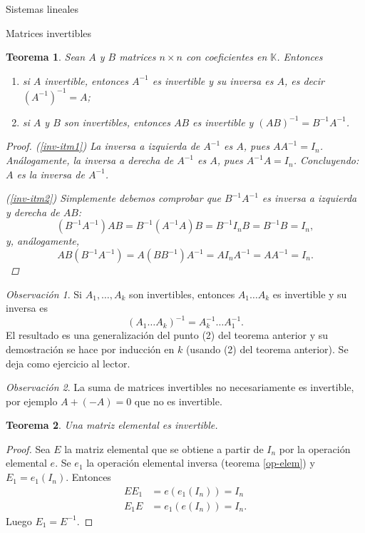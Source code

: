 \documentclass[a4paper,12pt,twoside,spanish]{amsbook}
\newtheorem{teorema}{Teorema}[section]
\theoremstyle{definition}
\theoremstyle{remark}
\newtheorem{observacion}{Observaci\'on}[section]
\newcommand{\K}{\mathbb K}
\begin{document}
\begin{chapter}{Sistemas lineales}
\begin{section}{Matrices invertibles}
			
			
			\begin{teorema}\label{th-prod-inv-impl-inv}
				Sean $A$ y $B$ matrices $n \times n$ con coeficientes en $\K$. Entonces
				\begin{enumerate}
					\item \label{inv-itm1} si $A$ invertible,  entonces $A^{-1}$  es invertible y su inversa es $A$,  es decir $(A^{-1})^{-1}=A$;
					\item \label{inv-itm2} si $A$ y $B$ son invertibles, entonces $AB$ es invertible y $(AB)^{-1} = B^{-1}A^{-1}$.
				\end{enumerate}
				\begin{proof}
					(\ref{inv-itm1}) La inversa a izquierda de $A^{-1}$ es $A$, pues $AA^{-1}=I_n$. Análogamente, la inversa a derecha de $A^{-1}$ es $A$, pues $A^{-1}A = I_n$. Concluyendo: $A$  es la inversa de $A^{-1}$.
					
					(\ref{inv-itm2}) Simplemente debemos comprobar que $B^{-1}A^{-1}$ es inversa a izquierda y derecha de $AB$:
					\begin{equation*}
					(B^{-1}A^{-1})AB = B^{-1}(A^{-1}A)B = B^{-1}I_nB =B^{-1}B = I_n,
					\end{equation*}
					y,  análogamente,
					\begin{equation*}
					AB(B^{-1}A^{-1}) = A(BB^{-1})A^{-1} = AI_nA^{-1} =AA^{-1} = I_n.
					\end{equation*} 
				\end{proof}
			\end{teorema}
			
			\begin{observacion}
				Si $A_1,\ldots,A_k$  son invertibles,  entonces $A_1\ldots A_k$ es invertible y su inversa es  $$(A_1\ldots A_k)^{-1} = A_k^{-1}\ldots A_1^{-1} .$$
				El resultado es una generalización del punto (2) del teorema anterior y su demostración se hace por inducción en $k$ (usando (2)  del teorema anterior). Se deja como ejercicio al lector. 
			\end{observacion}
			
			\begin{observacion}
				La suma de matrices invertibles no necesariamente es invertible, por ejemplo $A+ (-A)= 0$ que no es invertible. 
			\end{observacion}	
			
			
			\begin{teorema}\label{th-elmental-impl-invertible}
				Una matriz elemental es invertible.
			\end{teorema}
			\begin{proof}
				Sea $E$ la matriz elemental que se obtiene a partir de $I_n$ por la operación elemental $e$. Se $e_1$ la operación elemental inversa (teorema \ref{op-elem}) y $E_1 = e_1(I_n)$. Entonces 
				\begin{align*}
				EE_1 &= e(e_1(I_n)) = I_n \\
				E_1E &= e_1(e(I_n)) = I_n.
				\end{align*}
				Luego  $E_1 = E^{-1}$. 
			\end{proof}	
			

\end{section}
\end{chapter}
\end{document}

